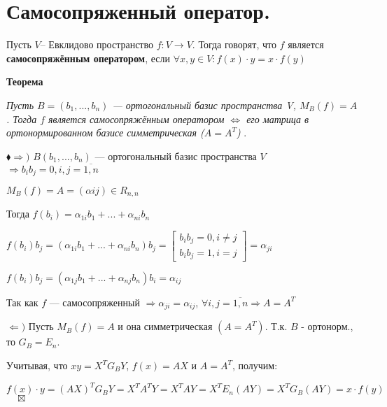 \documentclass[a4paper, 12pt]{report}
\begin{document}
	
	
	
	
	
	
	
	
	
	
	
	
	\section{Самосопряженный оператор.}
	\quad \; Пусть $V$– Евклидово пространство $f:{V \rightarrow V}$. Тогда говорят, что $f$  является \textbf{самосопряжённым оператором}, если $\forall x, y \in V: f(x)\cdot y=x\cdot f(y)$
	\par\bigskip
	\textbf{Теорема}
	
	\textit{Пусть $B = (b_1, ..., b_n)$ --- ортогональный базис пространства V, $M_B(f)=A$. Тогда $f$ является самосопряжённым оператором $\Longleftrightarrow$ его матрица в ортонормированном базисе симметрическая ($A = A^T$) }.
	\par\bigskip
	$\blacklozenge\Rightarrow) $
	$B(b_1, ..., b_n)$ --- ортогональный базис пространства $V$ $\Rightarrow  b_ib_j=0, i,j=\overline{1, n}$
	\par\bigskip
	$M_B(f)=A=(\alpha{ij})\in R_{n,n}$
	\par\bigskip
	Тогда $f(b_i)=\alpha_{1i}b_1+...+\alpha_{ni}b_n$
	\par\bigskip
	$f(b_i)b_j=(\alpha_{1i}b_1+...+\alpha_{ni}b_n)b_j=\begin{bmatrix}
		b_ib_j=0, i\neq j\\ 
		b_ib_j=1, i= j
	\end{bmatrix}=\alpha_{ji}$
	\par\bigskip
	$f(b_i)b_j=(\alpha_{1j}b_1+...+\alpha_{nj}b_n)b_i=\alpha_{ij}$
	\par\bigskip
	Так как $f$ --- самосопряженный $\Rightarrow  \alpha_{ji}=\alpha_{ij}$, $\forall i,j=\overline{1, n} \Rightarrow A=A^T$ 
	\par\bigskip
	
	
	$\Leftarrow) $
	Пусть $M_B(f)=A$ и она симметрическая $(A = A^T)$. Т.к. $B$ -  ортонорм., то $G_B=E_n.$
	\par\bigskip
	Учитывая, что $xy=X^TG_BY$, $f(x)=AX$ и $A = A^T$, получим:
	\par\bigskip
	$f(x)\cdot y=(AX)^TG_BY=X^TA^TY=X^TAY=X^TE_n(AY)=X^TG_B(AY)=x\cdot f(y)$
	$ \quad \boxtimes$ 
	
\end{document}
